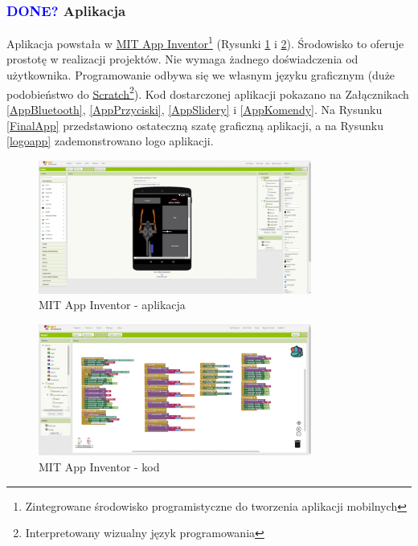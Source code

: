 \documentclass[11pt,titlepage,a4paper]{article}
\begin{document}
\subsubsection{\textcolor{blue}{DONE?} Aplikacja}

Aplikacja powstała w \href{https://appinventor.mit.edu}{\underline{MIT App Inventor}}\footnote{Zintegrowane środowisko programistyczne do tworzenia aplikacji mobilnych} (Rysunki \ref{MITapp} i \ref{MITblocks}). Środowisko to oferuje prostotę w realizacji projektów. Nie wymaga żadnego doświadczenia od użytkownika. Programowanie odbywa się we własnym języku graficznym (duże podobieństwo do \href{https://scratch.mit.edu}{\underline{Scratch}}\footnote{Interpretowany wizualny język programowania}). Kod dostarczonej aplikacji pokazano na Załącznikach \ref{AppBluetooth}, \ref{AppPrzyciski}, \ref{AppSlidery} i \ref{AppKomendy}. Na Rysunku \ref{FinalApp} przedstawiono ostateczną szatę graficzną aplikacji, a na Rysunku \ref{logoapp} zademonstrowano logo aplikacji.

\begin{figure}[h!]
    \begin{center}
        \includegraphics[width=0.8\textwidth]{img/app_src/MITapp.png}
    \end{center}
    \caption{MIT App Inventor - aplikacja}
    \label{MITapp}
\end{figure}

\begin{figure}[h!]
    \begin{center}
        \includegraphics[width=0.8\textwidth]{img/app_src/MITblocks.png}
    \end{center}
    \caption{MIT App Inventor - kod}
    \label{MITblocks}
\end{figure}
\end{document}
